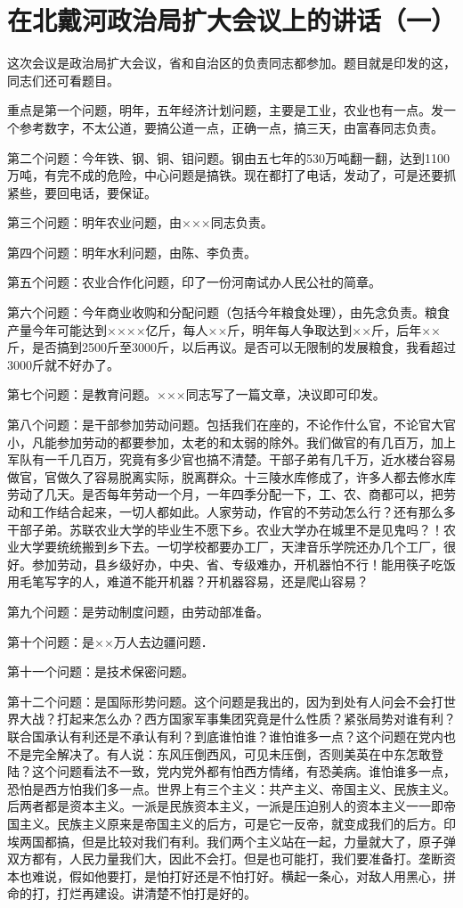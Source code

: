 \section[在北戴河政治局扩大会议上的讲话（一）（一九五八年八月十七日）]{在北戴河政治局扩大会议上的讲话（一）}


这次会议是政治局扩大会议，省和自治区的负责同志都参加。题目就是印发的这，同志们还可看题目。

重点是第一个问题，明年，五年经济计划问题，主要是工业，农业也有一点。发一个参考数字，不太公道，要搞公道一点，正确一点，搞三天，由富春同志负责。

第二个问题：今年铁、钢、铜、钼问题。钢由五七年的530万吨翻一翻，达到1100万吨，有完不成的危险，中心问题是搞铁。现在都打了电话，发动了，可是还要抓紧些，要回电话，要保证。

第三个问题：明年农业问题，由×××同志负责。

第四个问题：明年水利问题，由陈、李负责。

第五个问题：农业合作化问题，印了一份河南试办人民公社的简章。

第六个问题：今年商业收购和分配问题（包括今年粮食处理），由先念负责。粮食产量今年可能达到××××亿斤，每人××斤，明年每人争取达到××斤，后年××斤，是否搞到2500斤至3000斤，以后再议。是否可以无限制的发展粮食，我看超过3000斤就不好办了。

第七个问题：是教育问题。×××同志写了一篇文章，决议即可印发。

第八个问题：是干部参加劳动问题。包括我们在座的，不论作什么官，不论官大官小，凡能参加劳动的都要参加，太老的和太弱的除外。我们做官的有几百万，加上军队有一千几百万，究竟有多少官也搞不清楚。干部子弟有几千万，近水楼台容易做官，官做久了容易脱离实际，脱离群众。十三陵水库修成了，许多人都去修水库劳动了几天。是否每年劳动一个月，一年四季分配一下，工、农、商都可以，把劳动和工作结合起来，一切人都如此。人家劳动，作官的不劳动怎么行？还有那么多干部子弟。苏联农业大学的毕业生不愿下乡。农业大学办在城里不是见鬼吗？！农业大学要统统搬到乡下去。一切学校都要办工厂，天津音乐学院还办几个工厂，很好。参加劳动，县乡级好办，中央、省、专级难办，开机器怕不行！能用筷子吃饭用毛笔写字的人，难道不能开机器？开机器容易，还是爬山容易？

第九个问题：是劳动制度问题，由劳动部准备。

第十个问题：是××万人去边疆问题．

第十一个问题：是技术保密问题。

第十二个问题：是国际形势问题。这个问题是我出的，因为到处有人问会不会打世界大战？打起来怎么办？西方国家军事集团究竟是什么性质？紧张局势对谁有利？联合国承认有利还是不承认有利？到底谁怕谁？谁怕谁多一点？这个问题在党内也不是完全解决了。有人说：东风压倒西风，可见未压倒，否则美英在中东怎敢登陆？这个问题看法不一致，党内党外都有怕西方情绪，有恐美病。谁怕谁多一点，恐怕是西方怕我们多一点。世界上有三个主义：共产主义、帝国主义、民族主义。后两者都是资本主义。一派是民族资本主义，一派是压迫别人的资本主义一一即帝国主义。民族主义原来是帝国主义的后方，可是它一反帝，就变成我们的后方。印埃两国都搞，但是比较对我们有利。我们两个主义站在一起，力量就大了，原子弹双方都有，人民力量我们大，因此不会打。但是也可能打，我们要准备打。垄断资本也难说，假如他要打，是怕打好还是不怕打好。横起一条心，对敌人用黑心，拼命的打，打烂再建设。讲清楚不怕打是好的。

